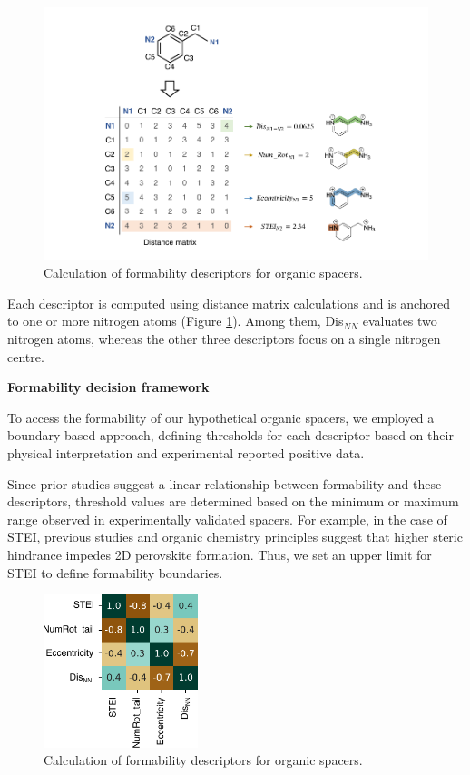 \begin{figure}[htbp]
    \centering
    \includegraphics[width=\textwidth]{figures/synthesis-feasibility/figure5-5.pdf}
    \caption{Calculation of formability descriptors for organic spacers.}
    \label{fig:figure5.5}
\end{figure}

Each descriptor is computed using distance matrix calculations and is anchored to one or more nitrogen atoms (Figure \ref{fig:figure5.5}). Among them, Dis$_{NN}$ evaluates two nitrogen atoms, whereas the other three descriptors focus on a single nitrogen centre.

\textbf{Formability decision framework}

To access the formability of our hypothetical organic spacers, we employed a boundary-based approach, defining thresholds for each descriptor based on their physical interpretation and experimental reported positive data. 

Since prior studies suggest a linear relationship between formability and these descriptors, threshold values are determined based on the minimum or maximum range observed in experimentally validated spacers. For example, in the case of STEI, previous studies and organic chemistry principles suggest that higher steric hindrance impedes 2D perovskite formation. Thus, we set an upper limit for STEI to define formability boundaries.




\begin{figure}[htbp]
    \centering
    \includegraphics[width=0.4\textwidth]{figures/synthesis-feasibility/figure5-6.pdf}
    \caption{Calculation of formability descriptors for organic spacers.}
    \label{fig:figure5.6}
\end{figure}

